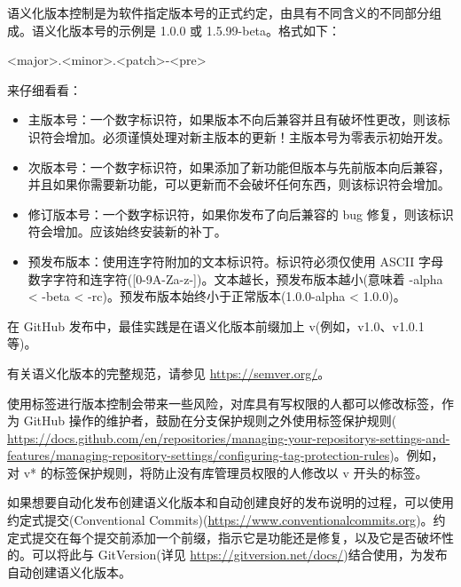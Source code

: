 语义化版本控制是为软件指定版本号的正式约定，由具有不同含义的不同部分组成。语义化版本号的示例是 1.0.0 或 1.5.99-beta。格式如下：

\begin{shell}
<major>.<minor>.<patch>-<pre>
\end{shell}

来仔细看看：

\begin{itemize}
\item 
主版本号：一个数字标识符，如果版本不向后兼容并且有破坏性更改，则该标识符会增加。必须谨慎处理对新主版本的更新！主版本号为零表示初始开发。

\item 
次版本号：一个数字标识符，如果添加了新功能但版本与先前版本向后兼容，并且如果你需要新功能，可以更新而不会破坏任何东西，则该标识符会增加。

\item 
修订版本号：一个数字标识符，如果你发布了向后兼容的 bug 修复，则该标识符会增加。应该始终安装新的补丁。

\item 
预发布版本：使用连字符附加的文本标识符。标识符必须仅使用 ASCII 字母数字字符和连字符([0-9A-Za-z-])。文本越长，预发布版本越小(意味着 -alpha < -beta < -rc)。预发布版本始终小于正常版本(1.0.0-alpha < 1.0.0)。
\end{itemize}


在 GitHub 发布中，最佳实践是在语义化版本前缀加上 v(例如，v1.0、v1.0.1 等)。

有关语义化版本的完整规范，请参见 \url{https://semver.org/}。


使用标签进行版本控制会带来一些风险，对库具有写权限的人都可以修改标签，作为 GitHub 操作的维护者，鼓励在分支保护规则之外使用标签保护规则( \url{https://docs.github.com/en/repositories/managing-your-repositorys-settings-and-features/managing-repository-settings/configuring-tag-protection-rules})。例如，对 v* 的标签保护规则，将防止没有库管理员权限的人修改以 v 开头的标签。

如果想要自动化发布创建语义化版本和自动创建良好的发布说明的过程，可以使用约定式提交(Conventional Commits)(\url{https://www.conventionalcommits.org})。约定式提交在每个提交前添加一个前缀，指示它是功能还是修复，以及它是否破坏性的。可以将此与 GitVersion(详见 \url{https://gitversion.net/docs/})结合使用，为发布自动创建语义化版本。